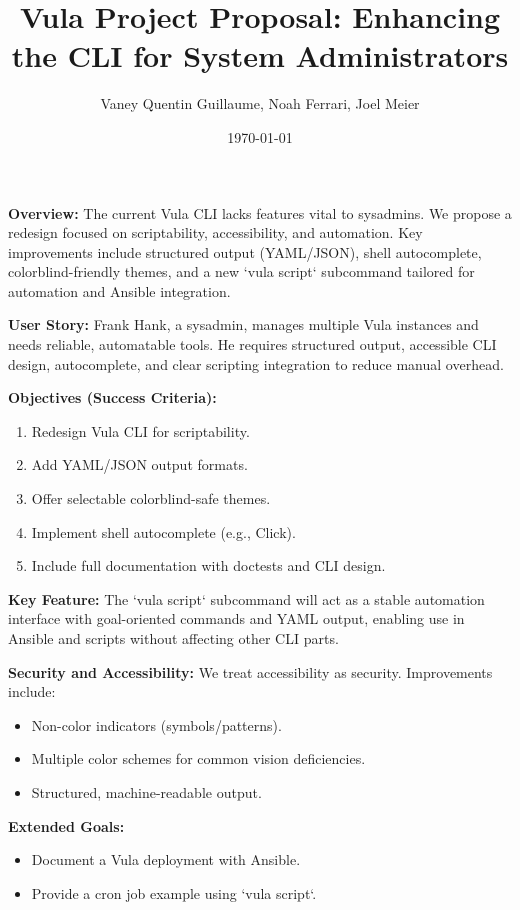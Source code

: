 \documentclass[12pt]{article}
\title{Vula Project Proposal: Enhancing the CLI for System Administrators}
\author{Vaney Quentin Guillaume, Noah Ferrari, Joel Meier}
\date{\today}
\begin{document}
	
	\maketitle
	
	\textbf{Overview:} The current Vula CLI lacks features vital to sysadmins. We propose a redesign focused on scriptability, accessibility, and automation. Key improvements include structured output (YAML/JSON), shell autocomplete, colorblind-friendly themes, and a new `vula script` subcommand tailored for automation and Ansible integration.
	
	\textbf{User Story:} Frank Hank, a sysadmin, manages multiple Vula instances and needs reliable, automatable tools. He requires structured output, accessible CLI design, autocomplete, and clear scripting integration to reduce manual overhead.
	
	\textbf{Objectives (Success Criteria):}
	\begin{enumerate}
		\item Redesign Vula CLI for scriptability.
		\item Add YAML/JSON output formats.
		\item Offer selectable colorblind-safe themes.
		\item Implement shell autocomplete (e.g., Click).
		\item Include full documentation with doctests and CLI design.
	\end{enumerate}
	
	\textbf{Key Feature:} The `vula script` subcommand will act as a stable automation interface with goal-oriented commands and YAML output, enabling use in Ansible and scripts without affecting other CLI parts.
	
	\textbf{Security and Accessibility:} We treat accessibility as security. Improvements include:
	\begin{itemize}
		\item Non-color indicators (symbols/patterns).
		\item Multiple color schemes for common vision deficiencies.
		\item Structured, machine-readable output.
	\end{itemize}
	
	\textbf{Extended Goals:}
	\begin{itemize}
		\item Document a Vula deployment with Ansible.
		\item Provide a cron job example using `vula script`.
	\end{itemize}
	
\end{document}
